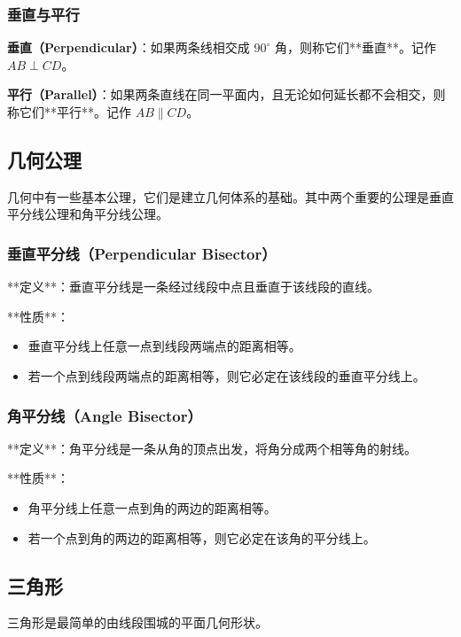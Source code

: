 \subsubsection{垂直与平行}

\textbf{垂直（Perpendicular）}：如果两条线相交成 $90^\circ$ 角，则称它们**垂直**。记作 $AB \perp CD$。

\textbf{平行（Parallel）}：如果两条直线在同一平面内，且无论如何延长都不会相交，则称它们**平行**。记作 $AB \parallel CD$。

\subsection{几何公理}

几何中有一些基本公理，它们是建立几何体系的基础。其中两个重要的公理是垂直平分线公理和角平分线公理。

\subsubsection{垂直平分线（Perpendicular Bisector）}

**定义**：垂直平分线是一条经过线段中点且垂直于该线段的直线。

**性质**：
\begin{itemize}
    \item 垂直平分线上任意一点到线段两端点的距离相等。
    \item 若一个点到线段两端点的距离相等，则它必定在该线段的垂直平分线上。
\end{itemize}

\subsubsection{角平分线（Angle Bisector）}

**定义**：角平分线是一条从角的顶点出发，将角分成两个相等角的射线。

**性质**：
\begin{itemize}
    \item 角平分线上任意一点到角的两边的距离相等。
    \item 若一个点到角的两边的距离相等，则它必定在该角的平分线上。
\end{itemize}


\subsection{三角形}

三角形是最简单的由线段围城的平面几何形状。

